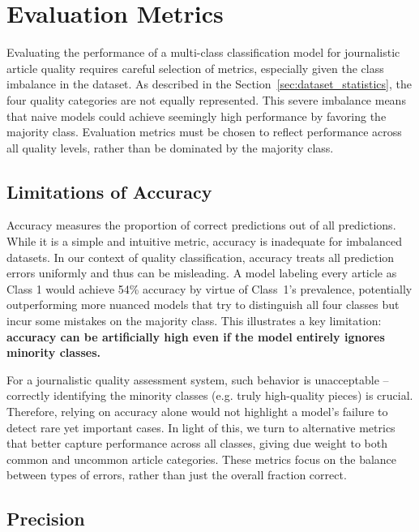 
\chapter{Evaluation Metrics\label{chap:evaluation}}

Evaluating the performance of a multi-class classification model for journalistic article quality requires careful selection of metrics, especially given the class imbalance in the dataset. As described in the Section~\ref{sec:dataset_statistics}, the four quality categories are not equally represented. This severe imbalance means that naive models could achieve seemingly high performance by favoring the majority class. Evaluation metrics must be chosen to reflect performance across all quality levels, rather than be dominated by the majority class.

\section{Limitations of Accuracy}
Accuracy measures the proportion of correct predictions out of all predictions. While it is a simple and intuitive metric, accuracy is inadequate for imbalanced datasets. In our context of quality classification, accuracy treats all prediction errors uniformly and thus can be misleading. A model labeling every article as \ac{Class 1} would achieve 54\% accuracy by virtue of Class 1’s prevalence, potentially outperforming more nuanced models that try to distinguish all four classes but incur some mistakes on the majority class. This illustrates a key limitation: \textbf{accuracy can be artificially high even if the model entirely ignores minority classes.} 

For a journalistic quality assessment system, such behavior is unacceptable – correctly identifying the minority classes (e.g. truly high-quality pieces) is crucial. Therefore, relying on accuracy alone would not highlight a model’s failure to detect rare yet important cases. In light of this, we turn to alternative metrics that better capture performance across all classes, giving due weight to both common and uncommon article categories. These metrics focus on the balance between types of errors, rather than just the overall fraction correct.

\section{Precision}

